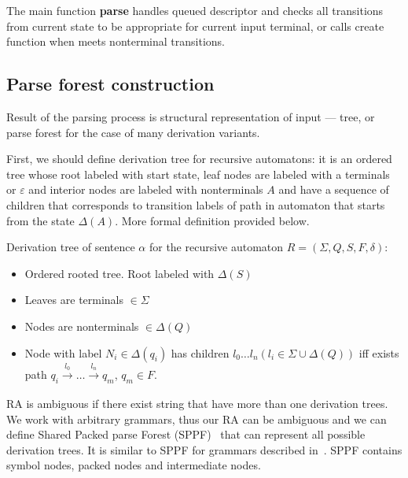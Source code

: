\documentclass[runningheads,a4paper]{llncs}
\begin{document}


The main function \textbf{parse} handles queued descriptor and checks all transitions from current state to be appropriate
for current input terminal, or calls create function when meets nonterminal transitions.


\subsection{Parse forest construction}

Result of the parsing process is structural representation of input --- tree, or parse forest for the case of many derivation variants.

First, we should define derivation tree for recursive automatons: it is an ordered tree whose root labeled with start state,
leaf nodes are labeled with a terminals or $\varepsilon$ and interior nodes are labeled with 
nonterminals $A$ and have a sequence of children that corresponds to transition labels of path in 
automaton that starts from the state $\Delta(A)$. More formal definition provided below. 

\begin{mydef}

Derivation tree of sentence $\alpha$ for the recursive automaton $R=(\Sigma, Q, S, F, \delta)$:%

\begin{itemize}
\item Ordered rooted tree. Root labeled with $\Delta(S)$
\item Leaves are terminals $\in \Sigma$
\item Nodes are nonterminals $\in \Delta(Q)$
\item Node with label $N_i \in \Delta(q_i)$ has children $l_0 \dots l_n (l_i \in \Sigma \cup \Delta(Q))$ iff exists
path
$q_i \xrightarrow[]{l_0} \dots \xrightarrow{l_n} q_m$, $q_m \in F$. 
\end{itemize}

\end{mydef}

RA is ambiguous if there exist string that have more than one derivation trees. 
We work with arbitrary grammars, thus our RA can be ambiguous and we can define Shared Packed parse Forest (SPPF)~\cite{SPPF} that can represent all possible derivation trees.
It is similar to SPPF for grammars described in~\cite{scott2013gll}. SPPF contains symbol nodes, packed nodes
and intermediate nodes. 
\end{document}
